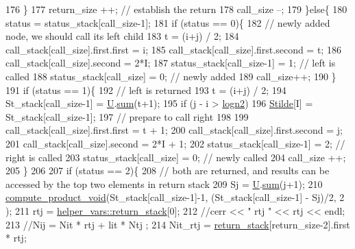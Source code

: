\begin{DoxyCode}
176       \}
177       return\_size ++; \textcolor{comment}{// establish the return}
178       call\_size --;
179     \}\textcolor{keywordflow}{else}\{
180       status = status\_stack[call\_size-1];
181       \textcolor{keywordflow}{if} (status == 0)\{
182         \textcolor{comment}{// newly added node, we should call its left child}
183         t = (i+j) / 2;
184         call\_stack[call\_size].first.first = i;
185         call\_stack[call\_size].first.second = t;
186         call\_stack[call\_size].second = 2*I;
187         status\_stack[call\_size-1] = 1; \textcolor{comment}{// left is called}
188         status\_stack[call\_size] = 0; \textcolor{comment}{// newly added}
189         call\_size++;
190       \}
191       \textcolor{keywordflow}{if} (status == 1)\{
192         \textcolor{comment}{// left is returned}
193         t = (i+j) / 2;
194         St\_stack[call\_size-1] = \hyperlink{classgraph__encoder_a3314c40920f2ee132958a6b0ce7e7995}{U}.\hyperlink{classreverse__fenwick__tree_a672731fd6395b4853430073a099a80e6}{sum}(t+1);
195         \textcolor{keywordflow}{if} (j - i > \hyperlink{classgraph__encoder_a27fde3a95a280304877b1e37fc4d8553}{logn2})
196           \hyperlink{classgraph__encoder_a342688a3fdee511b7fae3f155cfb10cf}{Stilde}[I] = St\_stack[call\_size-1];
197         \textcolor{comment}{// prepare to call right}
198         
199         call\_stack[call\_size].first.first = t + 1;
200         call\_stack[call\_size].first.second = j;
201         call\_stack[call\_size].second = 2*I + 1;
202         status\_stack[call\_size-1] = 2; \textcolor{comment}{// right is called}
203         status\_stack[call\_size] = 0; \textcolor{comment}{// newly called}
204         call\_size ++;
205       \}
206 
207       \textcolor{keywordflow}{if} (status == 2)\{
208         \textcolor{comment}{// both are returned, and results can be accessed by the top two elements in return stack}
209         Sj = \hyperlink{classgraph__encoder_a3314c40920f2ee132958a6b0ce7e7995}{U}.\hyperlink{classreverse__fenwick__tree_a672731fd6395b4853430073a099a80e6}{sum}(j+1);
210         \hyperlink{compression__helper_8cpp_af75857c18e9c23bb114e12642aa8c067}{compute\_product\_void}(St\_stack[call\_size-1]-1, (St\_stack[call\_size-1] - Sj)/2, 2
      );
211         rtj = \hyperlink{namespacehelper__vars_a6d2100c373830cacd232319a9958652d}{helper\_vars::return\_stack}[0];
212         \textcolor{comment}{//cerr << " rtj " << rtj << endl;}
213         \textcolor{comment}{//Nij = Nit * rtj + lit * Ntj ;}
214         Nit\_rtj = \hyperlink{namespacehelper__vars_a6d2100c373830cacd232319a9958652d}{return\_stack}[return\_size-2].first * rtj;

\end{DoxyCode}
